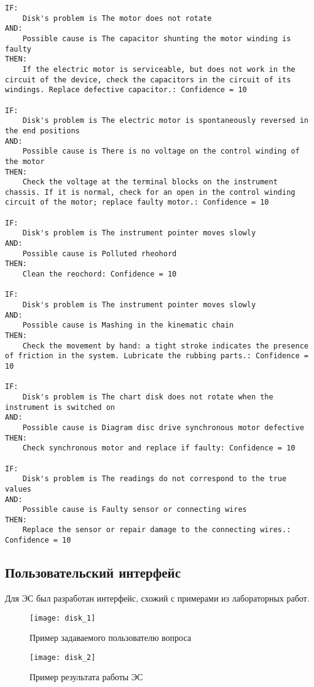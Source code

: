 \begin{lstlisting}[caption={Алгоритм работы ЭС}]
IF:
	Disk's problem is The motor does not rotate
AND:
	Possible cause is The capacitor shunting the motor winding is faulty
THEN:
	If the electric motor is serviceable, but does not work in the circuit of the device, check the capacitors in the circuit of its windings. Replace defective capacitor.: Confidence = 10

IF:
	Disk's problem is The electric motor is spontaneously reversed in the end positions
AND:
	Possible cause is There is no voltage on the control winding of the motor
THEN:
	Check the voltage at the terminal blocks on the instrument chassis. If it is normal, check for an open in the control winding circuit of the motor; replace faulty motor.: Confidence = 10

IF:
	Disk's problem is The instrument pointer moves slowly
AND:
	Possible cause is Polluted rheohord
THEN:
	Clean the reochord: Confidence = 10

IF:
	Disk's problem is The instrument pointer moves slowly
AND:
	Possible cause is Mashing in the kinematic chain
THEN:
	Check the movement by hand: a tight stroke indicates the presence of friction in the system. Lubricate the rubbing parts.: Confidence = 10

IF:
	Disk's problem is The chart disk does not rotate when the instrument is switched on
AND:
	Possible cause is Diagram disc drive synchronous motor defective
THEN:
	Check synchronous motor and replace if faulty: Confidence = 10

IF:
	Disk's problem is The readings do not correspond to the true values
AND:
	Possible cause is Faulty sensor or connecting wires
THEN:
	Replace the sensor or repair damage to the connecting wires.: Confidence = 10
\end{lstlisting}

\newpage

\subsection{Пользовательский интерфейс}

Для ЭС был разработан интерфейс, схожий с примерами из лабораторных работ.

\begin{figure}[H]
	\centering
	\texttt{[image: disk\_1]}
	\caption{Пример задаваемого пользователю вопроса}
\end{figure}

\begin{figure}[H]
	\centering
	\texttt{[image: disk\_2]}
	\caption{Пример результата работы ЭС}
\end{figure}

